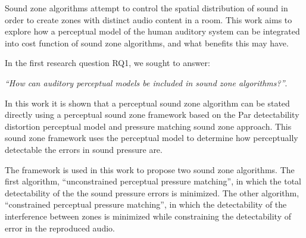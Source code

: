 Sound zone algorithms attempt to control the spatial distribution of sound 
in order to create zones with distinct audio content in a room.
This work aims to explore how a perceptual model of the human auditory system can be integrated into 
cost function of sound zone algorithms, and what benefits this may have.

In the first research question RQ1, we sought to answer:
\begin{center}
    {\textit{``How can auditory perceptual models be included in sound zone algorithms?''}}.\\
\end{center}
In this work it is shown that a perceptual sound zone algorithm can be stated directly using a perceptual sound 
zone framework based on the Par detectability distortion perceptual model and pressure matching sound zone approach.
This sound zone framework uses the perceptual model to determine how perceptually detectable the errors in 
sound pressure are.

The framework is used in this work to propose two sound zone algorithms.
The first algorithm, ``unconstrained perceptual pressure matching'', 
in which the total detectability of the the sound pressure errors is minimized.
The other algorithm, ``constrained perceptual pressure matching'', in which the
detectability of the interference between zones is minimized while constraining the detectability of error in 
the reproduced audio.

